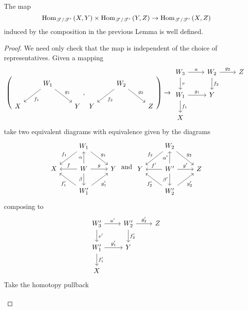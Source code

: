 \documentclass[dissertation.tex]{subfiles}
\begin{document}
\begin{lem}
  The map
  $$\operatorname{Hom}_{\mathscr{T}/\mathscr{T}^\prime}\left(X,Y\right) \times \operatorname{Hom}_{\mathscr{T}/\mathscr{T}^\prime}\left(Y,Z\right) \to \operatorname{Hom}_{\mathscr{T}/\mathscr{T}^\prime}\left(X,Z\right)$$
  induced by the composition in the previous Lemma is well defined.
  
  \begin{proof}
    We need only check that the map is independent of the choice of representatives.
    Given a mapping
    $$\left(\begin{tikzcd}
      & W_1 \arrow{ld}{f_1}\arrow{rd}{g_1}\\
      X & & Y
    \end{tikzcd}, 
    \begin{tikzcd}
      & W_2 \arrow{ld}{f_2}\arrow{rd}{g_2}\\
      Y & & Z
    \end{tikzcd}\right) \to 
    \begin{tikzcd}
      W_3\arrow{r}{u}\arrow{d}{v} & W_2\arrow{r}{g_2}\arrow{d}{f_2} & Z\\
      W_1 \arrow{r}{g_1}\arrow{d}{f_1}& Y\\
      X
    \end{tikzcd}$$
    take two equivalent diagrams with equivalence given by the diagrams
    $$\begin{tikzcd}
      & W_1 \arrow[swap]{ld}{f_1}\arrow{rd}{g_1}\\
      X & W \arrow[swap]{l}{f}\arrow{u}{\alpha}\arrow[swap]{d}{\beta}\arrow{r}{g} & Y\\
      & W_1^\prime \arrow{ul}{f_1^\prime}\arrow[swap]{ur}{g_1^\prime}
    \end{tikzcd}\ \text{and}\ 
    \begin{tikzcd}
      & W_2 \arrow[swap]{ld}{f_2}\arrow{rd}{g_2}\\
      Y & W^\prime \arrow[swap]{l}{f^\prime}\arrow{u}{\alpha^\prime}\arrow{r}{g^\prime}\arrow[swap]{d}{\beta^\prime} & Z\\
      & W_2^\prime \arrow{ul}{f_2^\prime}\arrow[swap]{ur}{g_2^\prime}
    \end{tikzcd}$$
    composing to 
    $$\begin{tikzcd}
      W_3^\prime \arrow{r}{u^\prime}\arrow{d}{v^\prime} & W_2^\prime \arrow{r}{g_2^\prime}\arrow{d}{f_2^\prime} & Z\\
      W_1^\prime \arrow{d}{f_1^\prime}\arrow{r}{g_1^\prime}& Y\\
      X
    \end{tikzcd}$$
    Take the homotopy pullback
    $$\begin{tikzcd}

\end{tikzcd}$$
\end{proof}
\end{lem}
\end{document}
